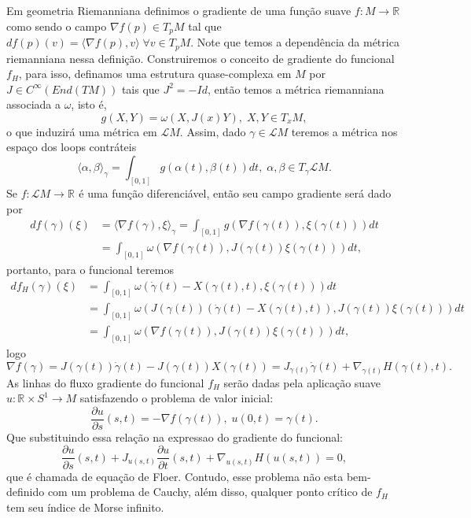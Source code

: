 \documentclass[12pt]{book}
\newcommand{\circulo}{S^{1}}
\newcommand{\derivadaparcial}[2]{\frac{\partial #1}{\partial #2}}
\newcommand{\iprod}[2]{\langle #1, #2 \rangle}
\newcommand{\retacartesianocirculo}{\real{} \times \circulo}
\newcommand{\real}[1]{\mathbb{R}^{#1}}
\newcommand{\solucoesperiodicascontrateis}{\mathcal{L}M}
\begin{document}
	Em geometria Riemanniana definimos o gradiente de uma função suave $f:M \to \real{}$ como sendo o campo $\nabla f(p) \in T_{p}M$ tal que $df(p)(v) = \iprod{ \nabla f(p)}{v}\; \forall v \in T_{p}M$. Note que temos a dependência da métrica riemanniana nessa definição. Construiremos o conceito de gradiente do funcional $f_{H}$, para isso, definamos uma estrutura quase-complexa em $M$ por $J \in C^{\infty}(End(TM))$ tais que $J^{2} = -Id$, então temos a métrica riemanniana associada a $\omega$, isto é,
	$$
	g(X, Y)= \omega(X, J(x)Y), \; X,Y \in T_{x}M,
	$$
	o que induzirá uma métrica em $\solucoesperiodicascontrateis$. Assim, dado $\gamma \in \solucoesperiodicascontrateis$ teremos a métrica nos espaço dos loops contráteis
	$$
	\iprod{\alpha}{\beta}_{\gamma} = \int_{[0,1]}g(\alpha(t), \beta(t))dt, \; \alpha, \beta \in T_{\gamma}\solucoesperiodicascontrateis.
	$$
	Se $f: \solucoesperiodicascontrateis \to \real{}$ é uma função diferenciável, então seu campo gradiente será dado por 
	$$
	\begin{aligned}
	df(\gamma)(\xi) &= \iprod{\nabla f(\gamma)}{\xi}_{\gamma} = \int_{[0,1]}g(\nabla f(\gamma(t)), \xi(\gamma(t)))dt
	\\
	&=\int_{[0,1]} \omega(\nabla f(\gamma(t)), J(\gamma(t))\xi(\gamma(t)))dt,
	\end{aligned}
	$$
	portanto, para o funcional teremos
	$$
	\begin{aligned}
		df_{H}(\gamma)(\xi) 
		&=  \int_{[0,1]} \omega(\dot{\gamma}(t) - X(\gamma(t), t), \xi(\gamma(t)))dt
		\\
		&= \int_{[0,1]} \omega(J(\gamma(t))(\dot{\gamma}(t) - X(\gamma(t), t)), J(\gamma(t))\xi(\gamma(t)))dt
		\\
		&= \int_{[0,1]} \omega(\nabla f(\gamma(t)), J(\gamma(t))\xi(\gamma(t)))dt,
	\end{aligned}
	$$
	logo 
	$$
	\nabla f(\gamma) = J(\gamma(t))\dot{\gamma}(t) - J(\gamma(t)) X(\gamma(t)) =J_{\gamma(t)}\dot{\gamma}(t) + \nabla_{\gamma(t)}H(\gamma(t), t).  
	$$
	As linhas do fluxo gradiente do funcional $f_{H}$ serão dadas pela aplicação suave $u : \retacartesianocirculo \to M$ satisfazendo o problema de valor inicial:
	$$
	\derivadaparcial{u}{s}(s,t) = -\nabla f(\gamma(t)), \; u(0,t) = \gamma(t).
	$$
	Que substituindo essa relação na expressao do gradiente do funcional:
	$$
	\derivadaparcial{u}{s}(s,t) + J_{u(s,t)}\derivadaparcial{u}{t}(s,t) + \nabla_{u(s,t)}H(u(s,t))=0, 
	$$
	que é chamada de equação de Floer. Contudo, esse problema não esta bem-definido com um problema de Cauchy, além disso, qualquer ponto crítico de $f_{H}$ tem seu índice de Morse infinito.
	
\end{document}
